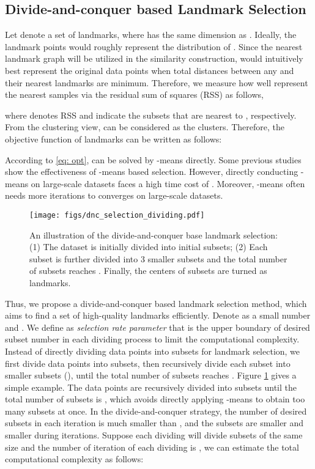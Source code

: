 \documentclass[a4paper,fleqn]{cas-dc}
\begin{document}
\subsection{Divide-and-conquer based Landmark Selection}
\label{sec:landmark_selection}

Let  denote a set of landmarks, where  has the same dimension as . 
Ideally, the landmark points  would roughly represent the distribution of .
Since the  nearest landmark graph will be utilized in the similarity construction,  would intuitively best represent the original data points when total distances between any  and their nearest landmarks are minimum.
Therefore, we measure how well  represent the nearest samples via the residual sum of squares (RSS) as follows,

where  denotes RSS and  indicate the subsets that are nearest to , respectively.
From the clustering view,  can be considered as the clusters. Therefore, the objective function of landmarks can be written as follows:

According to \eqref{eq: opt},  can be solved by -means directly.
Some previous studies \cite{cai2014large} show the effectiveness of -means based selection.
However, directly conducting -means on large-scale datasets faces a high time cost of .
Moreover, -means often needs more iterations to converges on large-scale datasets.


\begin{figure}
    \centering
    \texttt{[image: figs/dnc\_selection\_dividing.pdf]}
    \caption{An illustration of the divide-and-conquer base landmark selection: (1) The dataset is initially divided into  initial subsets; (2) Each subset is further divided into 3 smaller subsets and the total number of subsets reaches . Finally, the centers of subsets are turned as landmarks.
    }
    \label{fig:DnC Selection}
\end{figure}


Thus, we propose a divide-and-conquer based landmark selection method, which aims to find a set of high-quality landmarks efficiently.
Denote  as a small number and . 
We define  as \textit{selection rate parameter} that is the upper boundary of desired subset number in each dividing process to limit the computational complexity.
Instead of directly dividing data points into  subsets for landmark selection, we first divide data points into  subsets, then recursively divide each subset into  smaller subsets (), until the total number of subsets reaches .
Figure \ref{fig:DnC Selection} gives a simple example. The data points are
recursively divided into  subsets until the total number of subsets is , which avoids directly applying -means to obtain too many subsets at once.
In the divide-and-conquer strategy, the number of desired subsets in each iteration is much smaller than , and the subsets are smaller and smaller during iterations.
Suppose each dividing will divide  subsets of the same size and the number of iteration of each dividing is , we can estimate the total computational complexity as follows: 
\end{document}
